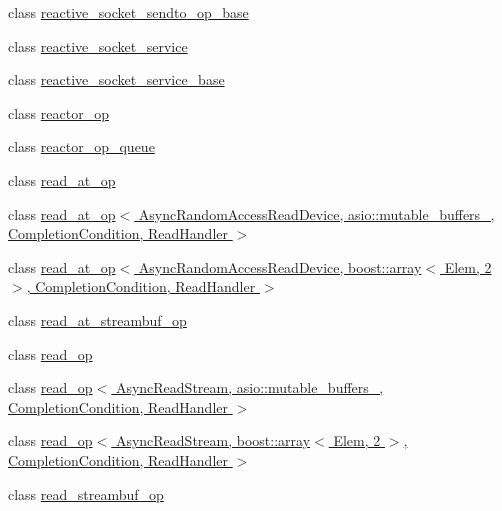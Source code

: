 \begin{DoxyCompactItemize}
\item 
class \hyperlink{classasio_1_1detail_1_1reactive__socket__sendto__op__base}{reactive\+\_\+socket\+\_\+sendto\+\_\+op\+\_\+base}
\item 
class \hyperlink{classasio_1_1detail_1_1reactive__socket__service}{reactive\+\_\+socket\+\_\+service}
\item 
class \hyperlink{classasio_1_1detail_1_1reactive__socket__service__base}{reactive\+\_\+socket\+\_\+service\+\_\+base}
\item 
class \hyperlink{classasio_1_1detail_1_1reactor__op}{reactor\+\_\+op}
\item 
class \hyperlink{classasio_1_1detail_1_1reactor__op__queue}{reactor\+\_\+op\+\_\+queue}
\item 
class \hyperlink{classasio_1_1detail_1_1read__at__op}{read\+\_\+at\+\_\+op}
\item 
class \hyperlink{classasio_1_1detail_1_1read__at__op_3_01_async_random_access_read_device_00_01_01_01_01_01_01_01ccd5681b695707fee491134502088d0f}{read\+\_\+at\+\_\+op$<$ Async\+Random\+Access\+Read\+Device,                           asio\+::mutable\+\_\+buffers\+\_, Completion\+Condition, Read\+Handler $>$}
\item 
class \hyperlink{classasio_1_1detail_1_1read__at__op_3_01_async_random_access_read_device_00_01boost_1_1array_3_00756f1b0c223a71b75bb1b3f8c0f0e31}{read\+\_\+at\+\_\+op$<$ Async\+Random\+Access\+Read\+Device, boost\+::array$<$ Elem, 2 $>$,                           Completion\+Condition, Read\+Handler $>$}
\item 
class \hyperlink{classasio_1_1detail_1_1read__at__streambuf__op}{read\+\_\+at\+\_\+streambuf\+\_\+op}
\item 
class \hyperlink{classasio_1_1detail_1_1read__op}{read\+\_\+op}
\item 
class \hyperlink{classasio_1_1detail_1_1read__op_3_01_async_read_stream_00_01asio_1_1mutable__buffers__1_00_01_018ff00a3c2aa5481d9cf38a1ea7821a38}{read\+\_\+op$<$ Async\+Read\+Stream, asio\+::mutable\+\_\+buffers\+\_,                           Completion\+Condition, Read\+Handler $>$}
\item 
class \hyperlink{classasio_1_1detail_1_1read__op_3_01_async_read_stream_00_01boost_1_1array_3_01_elem_00_012_01_4b92266d3d5081f809423aa72530eb694}{read\+\_\+op$<$ Async\+Read\+Stream, boost\+::array$<$ Elem, 2 $>$,                           Completion\+Condition, Read\+Handler $>$}
\item 
class \hyperlink{classasio_1_1detail_1_1read__streambuf__op}{read\+\_\+streambuf\+\_\+op}

\end{DoxyCompactItemize}
